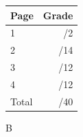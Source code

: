 \documentclass[12pt]{article}
\newcommand{\skipline}{\vspace{12pt}}
\begin{document}
\begin{table}[hbt]
\begin{center}
\begin{tabular}{|l|r|} \hline
Page&Grade\\
\hline \hline
\cline{1-2} 1 & \enspace\enspace\enspace\enspace\enspace\enspace/2\\
\cline{1-2} 2 & \enspace\enspace\enspace\enspace\enspace\enspace/14\\
\cline{1-2} 3 & \enspace\enspace\enspace\enspace\enspace\enspace/12\\
\cline{1-2} 4 & \enspace\enspace\enspace\enspace\enspace\enspace/12\\
\cline{1-2} Total & \enspace\enspace\enspace\enspace\enspace\enspace/40\\
\hline
\end{tabular}

\skipline

\skipline

\skipline

B
\end{center}
\end{table}
\newpage
\end{document}
